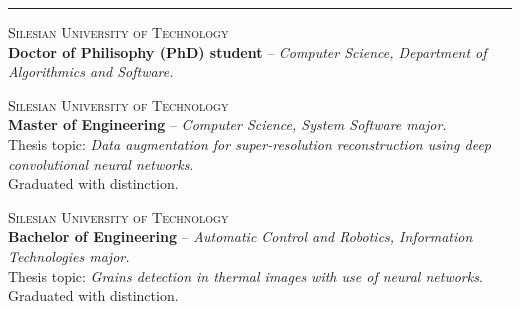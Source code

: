 \documentclass{article}
\begin{document}
\hrule \medskip

\noindent
\textsc{Silesian University of Technology} \\
\textbf{Doctor of Philisophy (PhD) student} -- \textit{Computer Science, Department of Algorithmics and Software.}

\medskip
{}
\noindent
\textsc{Silesian University of Technology} \\
\textbf{Master of Engineering} -- \textit{Computer Science, System Software major.} \\
Thesis topic: \textit{Data augmentation for super-resolution reconstruction using deep convolutional neural networks}. \\
Graduated with distinction.

\medskip
{}
\noindent
\textsc{Silesian University of Technology} \\
\textbf{Bachelor of Engineering} -- \textit{Automatic Control and Robotics, Information Technologies major.} \\
Thesis topic: \textit{Grains detection in thermal images with use of neural networks}. \\
Graduated with distinction.

\end{document}
